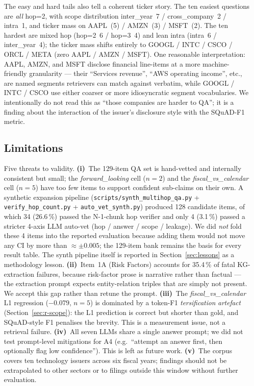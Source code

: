 \documentclass[11pt]{article}
\begin{document}
The easy and hard tails also tell a coherent ticker story. The ten
easiest questions are \emph{all} hop=2, with scope distribution
inter\_year~7 / cross\_company~2 / intra~1, and ticker mass on
AAPL~(5) / AMZN~(3) / MSFT~(2). The ten hardest are mixed hop
(hop=2~6 / hop=3~4) and lean intra (intra~6 / inter\_year~4); the
ticker mass shifts entirely to GOOGL / INTC / CSCO / ORCL / META
(zero AAPL / AMZN / MSFT). One reasonable interpretation: AAPL,
AMZN, and MSFT disclose financial line-items at a more
machine-friendly granularity --- their ``Services revenue'',
``AWS operating income'', etc., are named segments retrievers can
match against verbatim, while GOOGL / INTC / CSCO use either coarser
or more idiosyncratic segment vocabularies. We intentionally do not
read this as ``those companies are harder to QA''; it is a finding
about the interaction of the issuer's disclosure style with the
SQuAD-F1 metric.

\subsection{Limitations}
\label{sec:limits}
Five threats to validity. \textbf{(i)}~The 129-item QA set is
hand-vetted and internally consistent but small; the
\textit{forward\_looking} cell ($n=2$) and the
\textit{fiscal\_vs\_calendar} cell ($n=5$) have too few items to
support confident sub-claims on their own. A synthetic expansion
pipeline (\texttt{scripts/synth\_multihop\_qa.py} +
\texttt{verify\_hop\_count.py} + \texttt{auto\_vet\_synth.py})
produced 128 candidate items, of which 34 (26.6\,\%) passed the
N-1-chunk hop verifier and only 4 (3.1\,\%) passed a stricter
4-axis LLM auto-vet (hop / answer / scope / leakage). We did
\emph{not} fold these 4 items into the reported evaluation because
adding them would not move any CI by more than $\approx \pm 0.005$;
the 129-item bank remains the basis for every result table. The
synth pipeline itself is reported in Section~\ref{sec:lessons} as a
methodology lesson.
\textbf{(ii)}~Item~1A (Risk Factors) accounts for 35.4\,\% of fatal
KG-extraction failures, because risk-factor prose is narrative rather
than factual --- the extraction prompt expects entity-relation triples
that are simply not present. We accept this gap rather than retune the
prompt.
\textbf{(iii)}~The \textit{fiscal\_vs\_calendar} L1 regression
($-0.079$, $n=5$) is dominated by a token-F1 \emph{tersification
artefact} (Section~\ref{sec:r-scope}): the L1 prediction is correct
but shorter than gold, and SQuAD-style F1 penalises the brevity.
This is a measurement issue, not a retrieval failure.
\textbf{(iv)}~All seven LLMs share a single answer prompt; we did not
test prompt-level mitigations for A4 (e.g.\ ``attempt an answer first,
then optionally flag low confidence''). This is left as future work.
\textbf{(v)}~The corpus covers ten technology issuers across six
fiscal years; findings should not be extrapolated to other sectors
or to filings outside this window without further evaluation.
\end{document}
